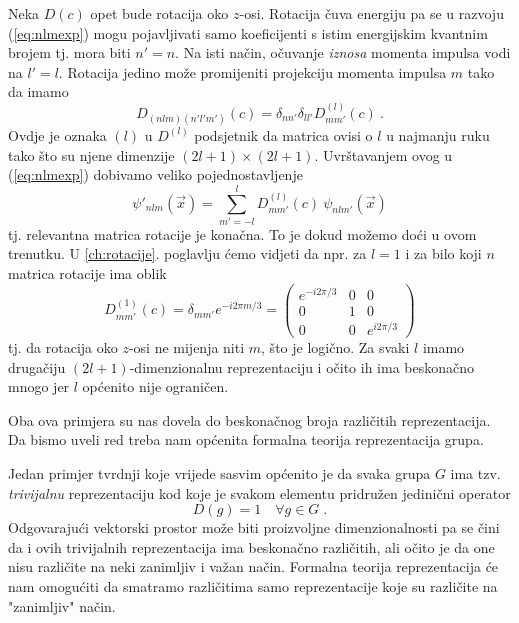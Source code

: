 \begin{primjer}
Neka $D(c)$ opet bude rotacija oko $z$-osi.
Rotacija čuva energiju pa se u razvoju (\ref{eq:nlmexp}) mogu pojavljivati 
samo koeficijenti s istim energijskim kvantnim brojem tj. mora biti $n'=n$. 
Na isti način, očuvanje \emph{iznosa} momenta impulsa vodi na $l'=l$. Rotacija
jedino može promijeniti projekciju momenta impulsa $m$ tako da imamo
\begin{displaymath}
D_{(nlm)(n'l'm')}(c)=\delta_{nn'}\delta_{ll'}D^{(l)}_{mm'}(c) \:.
\end{displaymath}
Ovdje je oznaka $(l)$ u $D^{(l)}$ podsjetnik da matrica ovisi o $l$ u najmanju
ruku tako što su njene dimenzije $(2l+1)\times (2l+1)$. Uvrštavanjem ovog u
(\ref{eq:nlmexp}) dobivamo veliko pojednostavljenje
\begin{displaymath}
\psi'_{nlm}(\vec{x})=  \sum_{m'=-l}^{l} D^{(l)}_{mm'}(c) \: \psi_{nlm'}(\vec{x})
\end{displaymath}
tj. relevantna matrica rotacije je konačna.
To je dokud možemo doći u ovom trenutku. U \ref{ch:rotacije}. poglavlju ćemo
vidjeti da npr. za $l=1$ i za bilo koji $n$ matrica rotacije ima oblik
\begin{equation*}
D^{(1)}_{mm'}(c)=\delta_{mm'}e^{ -i 2\pi m/3} =
\begin{pmatrix}
e^{-i2\pi/3} & 0 & 0 \\
0 &  1 & 0 \\
0 & 0 & e^{i 2\pi/3}
\end{pmatrix}
\end{equation*}
tj. da rotacija oko $z$-osi ne mijenja niti $m$, što je logično.
Za svaki $l$ imamo drugačiju $(2l+1)$-dimenzionalnu reprezentaciju i
očito ih ima beskonačno mnogo jer $l$ općenito nije ograničen.
\end{primjer}

Oba ova primjera su nas dovela do beskonačnog broja različitih
reprezentacija.
Da bismo uveli red treba nam općenita formalna teorija reprezentacija grupa.


Jedan primjer tvrdnji koje vrijede sasvim općenito je
da svaka grupa $G$ ima tzv. \emph{trivijalnu} reprezentaciju
kod koje je svakom elementu pridružen jedinični operator
\begin{displaymath}
             D(g)=1 \quad \forall g \in G  \;.
\end{displaymath}
Odgovarajući vektorski prostor može biti proizvoljne
dimenzionalnosti pa se čini da i ovih trivijalnih reprezentacija 
ima beskonačno različitih, ali očito je da one nisu različite
na neki zanimljiv i važan način. Formalna teorija reprezentacija
će nam omogućiti da smatramo različitima samo reprezentacije koje
su različite na "zanimljiv" način.


